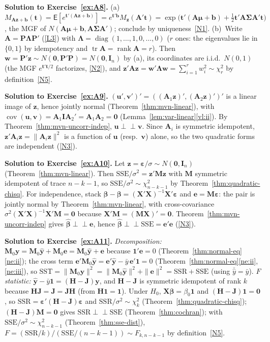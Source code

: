 \documentclass[12pt,a4paper]{article}
\theoremstyle{definition}
\newcommand\expc{\mathsf{E}}
\DeclareMathOperator\cov{cov}
\DeclareMathOperator\tr{tr}
\DeclareMathOperator\rank{rank}
\DeclareMathOperator\diag{diag}
\newcommand{\SST}{\mathrm{SST}}
\newcommand{\SSR}{\mathrm{SSR}}
\newcommand{\SSE}{\mathrm{SSE}}
\newcommand{\bX}{\mathbf{X}}
\newcommand{\by}{\mathbf{y}}
\def\bb{\boldsymbol{\beta}}
\newcommand{\be}{\boldsymbol{\varepsilon}}
\newcommand{\bI}{\mathbf{I}}
\newcommand{\bH}{\mathbf{H}}
\newcommand{\bM}{\mathbf{M}}
\newcommand{\bone}{\mathbf{1}}
\newcommand{\bzero}{\mathbf{0}}
\newcommand{\bz}{\mathbf{z}}
\newcommand{\bw}{\mathbf{w}}
\newcommand{\bA}{\mathbf{A}}
\newcommand{\bP}{\mathbf{P}}
\newcommand{\bv}{\mathbf{v}}
\newcommand{\bJ}{\mathbf{J}}
\newcommand{\indep}{\perp\!\!\!\perp}
\newcommand{\bu}{\mathbf{u}}
\begin{document}
\textbf{Solution to Exercise~\ref{ex:A8}.} (a)~$M_{\bA\bz+\mathbf{b}}(\mathbf{t}) = \expc[e^{\mathbf{t}'(\bA\bz+\mathbf{b})}] = e^{\mathbf{t}'\mathbf{b}}M_{\bz}(\bA'\mathbf{t}) = \exp\bigl(\mathbf{t}'(\bA\boldsymbol\mu+\mathbf{b}) + \tfrac12\mathbf{t}'\bA\boldsymbol\Sigma\bA'\mathbf{t}\bigr)$, the MGF of $N(\bA\boldsymbol\mu+\mathbf{b}, \bA\boldsymbol\Sigma\bA')$; conclude by uniqueness~\ref{N1}. (b)~Write $\bA = \bP\boldsymbol\Lambda\bP'$ (\ref{L3}) with $\boldsymbol\Lambda = \diag(1,\ldots,1,0,\ldots,0)$ ($r$ ones: the eigenvalues lie in $\{0,1\}$ by idempotency and $\tr\bA = \rank\bA = r$). Then $\bw = \bP'\bz \sim N(\bzero, \bP'\bP) = N(\bzero, \bI_n)$ by (a), its coordinates are i.i.d.\ $N(0,1)$ (the MGF $e^{\mathbf{t}'\mathbf{t}/2}$ factorizes, \ref{N2}), and $\bz'\bA\bz = \bw'\boldsymbol\Lambda\bw = \sum_{i=1}^r w_i^2 \sim \chi^2_r$ by definition~\ref{N5}.

\textbf{Solution to Exercise~\ref{ex:A9}.} $(\bu', \bv')' = ((\bA_1\bz)', (\bA_2\bz)')'$ is a linear image of $\bz$, hence jointly normal (Theorem~\ref{thm:mvn-linear}), with $\cov(\bu, \bv) = \bA_1\bI\bA_2' = \bA_1\bA_2 = \bzero$ (Lemma~\ref{lem:var-linear}\ref{vl:ii}). By Theorem~\ref{thm:mvn-uncorr-indep}, $\bu \indep \bv$. Since $\bA_i$ is symmetric idempotent, $\bz'\bA_i\bz = \|\bA_i\bz\|^2$ is a function of $\bu$ (resp.\ $\bv$) alone, so the two quadratic forms are independent (\ref{N3}).

\textbf{Solution to Exercise~\ref{ex:A10}.} Let $\bz = \be/\sigma \sim N(\bzero, \bI_n)$ (Theorem~\ref{thm:mvn-linear}). Then $\SSE/\sigma^2 = \bz'\bM\bz$ with $\bM$ symmetric idempotent of trace $n-k-1$, so $\SSE/\sigma^2 \sim \chi^2_{n-k-1}$ by Theorem~\ref{thm:quadratic-chisq}. For independence, stack $\hat{\bb} - \bb = (\bX'\bX)^{-1}\bX'\be$ and $\mathbf{e} = \bM\be$: the pair is jointly normal by Theorem~\ref{thm:mvn-linear}, with cross-covariance $\sigma^2(\bX'\bX)^{-1}\bX'\bM = \bzero$ because $\bX'\bM = (\bM\bX)' = \bzero$. Theorem~\ref{thm:mvn-uncorr-indep} gives $\hat{\bb} \indep \mathbf{e}$, hence $\hat{\bb} \indep \SSE = \mathbf{e}'\mathbf{e}$ (\ref{N3}).

\textbf{Solution to Exercise~\ref{ex:A11}.} \emph{Decomposition:} $\bM_0\by = \bM_0\hat{\by} + \bM_0\mathbf{e} = \bM_0\hat{\by} + \mathbf{e}$ because $\bone'\mathbf{e} = 0$ (Theorem~\ref{thm:normal-eq}\ref{ne:ii}); the cross term $\mathbf{e}'\bM_0\hat{\by} = \mathbf{e}'\hat{\by} - \bar y\,\mathbf{e}'\bone = 0$ (Theorem~\ref{thm:normal-eq}\ref{ne:ii}, \ref{ne:iii}), so $\SST = \|\bM_0\by\|^2 = \|\bM_0\hat{\by}\|^2 + \|\mathbf{e}\|^2 = \SSR + \SSE$ (using $\overline{\hat y} = \bar y$). \emph{$F$ statistic:} $\hat{\by} - \bar y\bone = (\bH - \bJ)\by$, and $\bH - \bJ$ is symmetric idempotent of rank $k$ because $\bH\bJ = \bJ = \bJ\bH$ (from $\bH\bone = \bone$). Under $H_0$, $\bX\bb = \beta_0\bone$ and $(\bH - \bJ)\bone = \bzero$, so $\SSR = \be'(\bH - \bJ)\be$ and $\SSR/\sigma^2 \sim \chi^2_k$ (Theorem~\ref{thm:quadratic-chisq}); $(\bH - \bJ)\bM = \bzero$ gives $\SSR \indep \SSE$ (Theorem~\ref{thm:cochran}); with $\SSE/\sigma^2 \sim \chi^2_{n-k-1}$ (Theorem~\ref{thm:sse-dist}), $F = (\SSR/k)/(\SSE/(n-k-1)) \sim F_{k,n-k-1}$ by definition~\ref{N5}.
\end{document}
